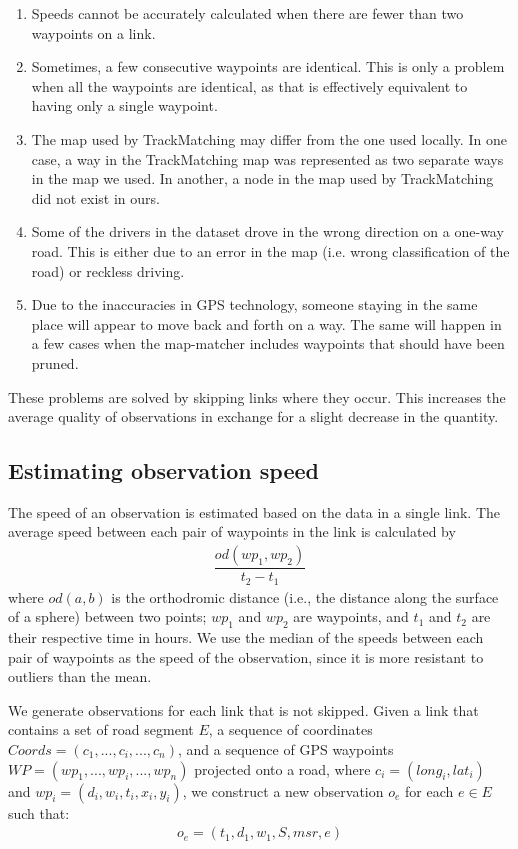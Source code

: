 \begin{enumerate}
	\item Speeds cannot be accurately calculated when there are fewer than two waypoints on a link.
	\item Sometimes, a few consecutive waypoints are identical. This is only a problem when all the waypoints are identical, as that is effectively equivalent to having only a single waypoint.
	\item The map used by TrackMatching may differ from the one used locally. In one case, a way in the TrackMatching map was represented as two separate ways in the map we used. In another, a node in the map used by TrackMatching did not exist in ours.
	\item Some of the drivers in the dataset drove in the wrong direction on a one-way road. This is either due to an error in the map (i.e. wrong classification of the road) or reckless driving.
	\item Due to the inaccuracies in GPS technology, someone staying in the same place will appear to move back and forth on a way. The same will happen in a few cases when the map-matcher includes waypoints that should have been pruned.
\end{enumerate}

These problems are solved by skipping links where they occur. This increases the average quality of observations in exchange for a slight decrease in the quantity.

\subsection{Estimating observation speed}\label{KR:speed} 
The speed of an observation is estimated based on the data in a single link. The average speed between each pair of waypoints in the link is calculated by
\begin{align*}
\dfrac{od(wp_1, wp_2)}{t_2 - t_1}
\end{align*}
where $od(a, b)$ is the orthodromic distance (i.e., the distance along the surface of a sphere) between two points; $wp_1$ and $wp_2$ are waypoints, and $t_1$ and $t_2$ are their respective time in hours. We use the median of the speeds between each pair of waypoints as the speed of the observation, since it is more resistant to outliers than the mean.

We generate observations for each link that is not skipped. Given a link that contains a set of road segment $E$, a sequence of coordinates $Coords = (c_1,...,c_i,...,c_n)$, and a sequence of GPS waypoints $WP=(wp_1,...,wp_i,...,wp_n)$ projected onto a road, where $c_i = (long_i, lat_i)$ and $wp_i = (d_i, w_i, t_i, x_i, y_i)$, we construct a new observation $o_e$ for each $e \in E$ such that:
\begin{align*}
o_e = (t_1, d_1, w_1, S, msr, e)
\end{align*}

